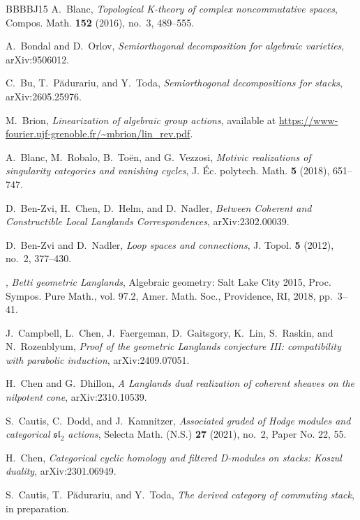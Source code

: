 \documentclass [11pt,oneside,a4paper,mathscr]{amsart}
\theoremstyle{definition}
\begin{document}
\begin{thebibliography}{BBBBJ15}
A.~Blanc, \emph{Topological {K}-theory of complex noncommutative spaces}, Compos. Math. \textbf{152} (2016), no.~3, 489--555.

A.~Bondal and D.~Orlov, \emph{Semiorthogonal decomposition for algebraic varieties}, arXiv:9506012.

C.~Bu, T.~P\u{a}durariu, and Y.~Toda, \emph{Semiorthogonal decompositions for stacks}, arXiv:2605.25976.

M.~Brion, \emph{Linearization of algebraic group actions}, available at \url{https://www-fourier.ujf-grenoble.fr/~mbrion/lin_rev.pdf}.

A.~Blanc, M.~Robalo, B.~To\"{e}n, and G.~Vezzosi, \emph{Motivic realizations of singularity categories and vanishing cycles}, J. \'{E}c. polytech. Math. \textbf{5} (2018), 651--747.

D.~Ben-Zvi, H.~Chen, D.~Helm, and D.~Nadler, \emph{Between {C}oherent and {C}onstructible {L}ocal {L}anglands {C}orrespondences}, arXiv:2302.00039.

D.~Ben-Zvi and D.~Nadler, \emph{Loop spaces and connections}, J. Topol. \textbf{5} (2012), no.~2, 377–430.

\bysame, \emph{Betti geometric {L}anglands}, Algebraic geometry: {S}alt {L}ake {C}ity 2015, Proc. Sympos. Pure Math., vol. 97.2, Amer. Math. Soc., Providence, RI, 2018, pp.~3--41.

J.~Campbell, L.~Chen, J.~Faergeman, D.~Gaitsgory, K.~Lin, S.~Raskin, and N.~Rozenblyum, \emph{Proof of the geometric {L}anglands conjecture {III}: compatibility with parabolic induction}, arXiv:2409.07051.

H.~Chen and G.~Dhillon, \emph{A {L}anglands dual realization of coherent sheaves on the nilpotent cone}, arXiv:2310.10539.

S.~Cautis, C.~Dodd, and J.~Kamnitzer, \emph{Associated graded of {H}odge modules and categorical {$\mathfrak{sl}_2$} actions}, Selecta Math. (N.S.) \textbf{27} (2021), no.~2, Paper No. 22, 55.

H.~Chen, \emph{Categorical cyclic homology and filtered {D}-modules on stacks: {K}oszul duality}, arXiv:2301.06949.

S.~Cautis, T.~P\u{a}durariu, and Y.~Toda, \emph{The derived category of commuting stack}, in preparation.


\end{thebibliography}
\end{document}

